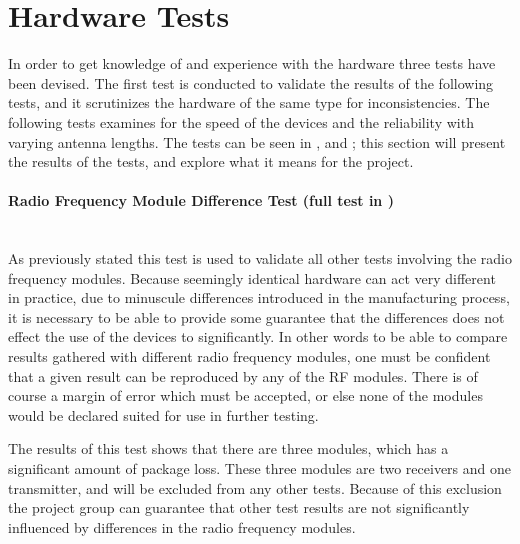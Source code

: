 \clearpage
\section{Hardware Tests} %
\label{sec:hardware_tests}
In order to get knowledge of and experience with the hardware three tests have been devised.
The first test is conducted to validate the results of the following tests, and it scrutinizes the hardware of the same type for inconsistencies.
The following tests examines for the speed of the devices and the reliability with varying antenna lengths.
The tests can be seen in ,  and ; this section will present the results of the tests, and explore what it means for the project.

\paragraph{Radio Frequency Module Difference Test (full test in )}%
\label{par:radio_frequency_module_difference_test}\hfill\\
As previously stated this test is used to validate all other tests involving the radio frequency modules.
Because seemingly identical hardware can act very different in practice, due to minuscule differences introduced in the manufacturing process, it is necessary to be able to provide some guarantee that the differences does not effect the use of the devices to significantly.
In other words to be able to compare results gathered with different radio frequency modules, one must be confident that a given result can be reproduced by any of the RF modules.
There is of course a margin of error which must be accepted, or else none of the modules would be declared suited for use in further testing.

The results of this test shows that there are three modules, which has a significant amount of package loss.
These three modules are two receivers and one transmitter, and will be excluded from any other tests.
Because of this exclusion the project group can guarantee that other test results are not significantly influenced by differences in the radio frequency modules. 

